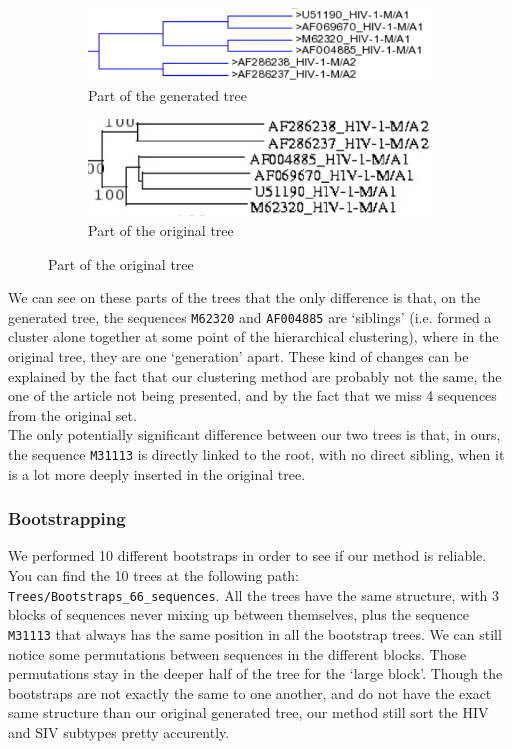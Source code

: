 \documentclass[english,13pt,a4paper]{article}
\theoremstyle{definition}
\theoremstyle{remark}
\theoremstyle{defstyle}
\begin{document}
\begin{figure}[H]
    \centering
    \begin{subfigure}{0.48\textwidth}
        \centering
        \includegraphics[width=\textwidth]{Images/Example_66.png}
        \caption{Part of the generated tree}
    \end{subfigure}
    \hfill
    \begin{subfigure}{0.48\textwidth}
        \centering
        \includegraphics[width=\textwidth]{Images/Example_Orig66.png}
        \caption{Part of the original tree}
    \end{subfigure}
\end{figure}

We can see on these parts of the trees that the only difference is that, on the generated tree, the sequences \texttt{M62320} and \texttt{AF004885} are `siblings' (i.e. formed a cluster alone together at some point of the hierarchical clustering), where in the original tree, they are one `generation' apart. These kind of changes can be explained by the fact that our clustering method are probably not the same, the one of the article not being presented, and by the fact that we miss 4 sequences from the original set.\\

The only potentially significant difference between our two trees is that, in ours, the sequence \texttt{M31113} is directly linked to the root, with no direct sibling, when it is a lot more deeply inserted in the original tree. 

\subsubsection{Bootstrapping}

We performed 10 different bootstraps in order to see if our method is reliable. You can find the 10 trees at the following path: \texttt{Trees/Bootstraps\_66\_sequences}. All the trees have the same structure, with 3 blocks of sequences never mixing up between themselves, plus the sequence \texttt{M31113} that always has the same position in all the bootstrap trees. We can still notice some permutations between sequences in the different blocks. Those permutations stay in the deeper half of the tree for the `large block'. Though the bootstraps are not exactly the same to one another, and do not have the exact same structure than our original generated tree, our method still sort the HIV and SIV subtypes pretty accurently.
\end{document}
